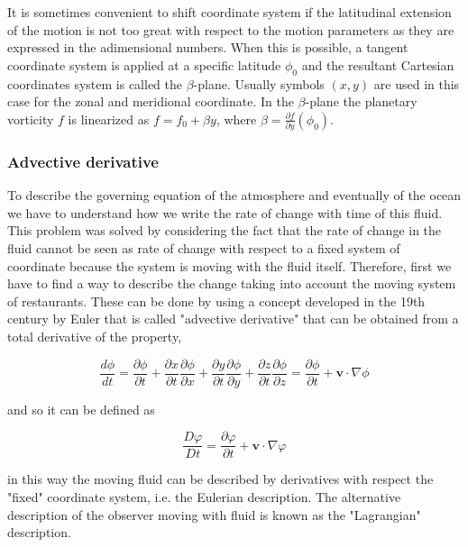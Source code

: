 It is sometimes convenient to shift coordinate system if the latitudinal
extension of the motion is not too great with respect to the motion
parameters as they are expressed in the adimensional numbers. When this
is possible, a tangent coordinate system is applied at a specific
latitude \(\phi_0\) and the resultant Cartesian coordinates system is
called the \(\beta\)-plane. Usually symbols \((x,y)\) are used in this
case for the zonal and meridional coordinate. In the \(\beta\)-plane the
planetary vorticity \(f\) is linearized as \(f=f_0 + \beta y\), where
\(\beta = \frac{\partial f}{\partial y}({\phi_0})\).

\subsubsection{Advective derivative}\label{Sec:Adv}

To describe the governing equation of the atmosphere and eventually of
the ocean we have to understand how we write the rate of change with
time of this fluid. This problem was solved by considering the fact that
the rate of change in the fluid cannot be seen as rate of change with
respect to a fixed system of coordinate because the system is moving
with the fluid itself. Therefore, first we have to find a way to
describe the change taking into account the moving system of
restaurants. These can be done by using a concept developed in the 19th
century by Euler that is called "advective derivative" that can be
obtained from a total derivative of the property,

\[\frac{d \phi}{dt} = \frac{\partial \phi}{\partial t} + \frac{\partial x}{\partial t}\frac{\partial \phi}{\partial x} + \frac{\partial y}{\partial t}\frac{\partial \phi}{\partial y}+\frac{\partial z}{\partial t}\frac{\partial \phi}{\partial z} = \frac{\partial \phi}{\partial t} + \mathbf{v}\cdot\nabla\phi\]

and so it can be defined as

\[\frac{D \varphi}{Dt} =\frac{\partial \varphi}{\partial t} + \mathbf{v}\cdot\nabla\varphi\]

in this way the moving fluid can be described by derivatives with
respect the "fixed" coordinate system, i.e. the Eulerian description.
The alternative description of the observer moving with fluid is known
as the "Lagrangian" description.



